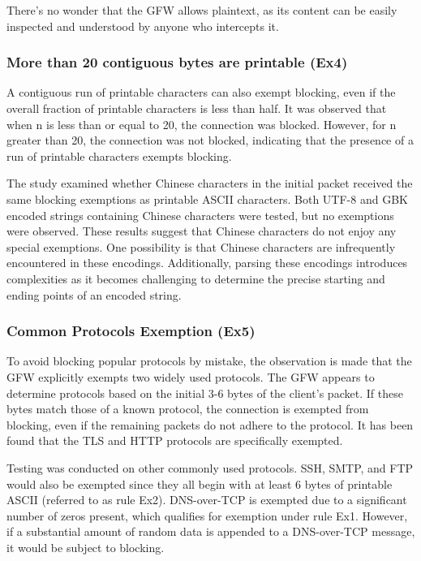 There's no wonder that the GFW allows plaintext, as its content can be easily inspected and understood by anyone who intercepts it.

\subsubsection{\textbf{More than 20 contiguous bytes are printable (Ex4)}}
A contiguous run of printable characters can also exempt blocking, even if the overall fraction of printable characters is less than half. It was observed that when n is less than or equal to 20, the connection was blocked. However, for n greater than 20, the connection was not blocked, indicating that the presence of a run of printable characters exempts blocking.

The study examined whether Chinese characters in the initial packet received the same blocking exemptions as printable ASCII characters. Both UTF-8 and GBK encoded strings containing Chinese characters were tested, but no exemptions were observed. These results suggest that Chinese characters do not enjoy any special exemptions. One possibility is that Chinese characters are infrequently encountered in these encodings. Additionally, parsing these encodings introduces complexities as it becomes challenging to determine the precise starting and ending points of an encoded string.

\subsubsection{\textbf{Common Protocols Exemption (Ex5)}}
To avoid blocking popular protocols by mistake, the observation is made that the GFW explicitly exempts two widely used protocols. The GFW appears to determine protocols based on the initial 3-6 bytes of the client's packet. If these bytes match those of a known protocol, the connection is exempted from blocking, even if the remaining packets do not adhere to the protocol. It has been found that the TLS and HTTP protocols are specifically exempted.

Testing was conducted on other commonly used protocols. SSH, SMTP, and FTP would also be exempted since they all begin with at least 6 bytes of printable ASCII (referred to as rule Ex2). DNS-over-TCP is exempted due to a significant number of zeros present, which qualifies for exemption under rule Ex1. However, if a substantial amount of random data is appended to a DNS-over-TCP message, it would be subject to blocking.

